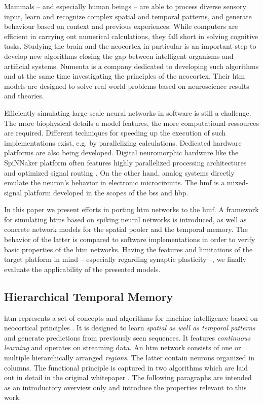 Mammals -- and especially human beings -- are able to process diverse sensory input, learn and recognize complex spatial and temporal patterns, and generate behaviour based on context and previous experiences. While computers are efficient in carrying out numerical calculations, they fall short in solving cognitive tasks. Studying the brain and the neocortex in particular is an important step to develop new algorithms closing the gap between intelligent organisms and artificial systems. Numenta is a company dedicated to developing such algorithms and at the same time investigating the principles of the neocortex. Their \gls{htm} models are designed to solve real world problems based on neuroscience results and theories.

Efficiently simulating large-scale neural networks in software is still a challenge. The more biophysical details a model features, the more computational ressources are required. Different techniques for speeding up the execution of such implementations exist, e.g. by parallelizing calculations. Dedicated hardware platforms are also being developed. Digital neuromorphic hardware like the SpiNNaker platform often features highly parallelized processing architectures and optimized signal routing \citep{furber2014spinnaker}. On the other hand, analog systems directly emulate the neuron's behavior in electronic microcircuits. The \gls{hmf} is a mixed-signal platform developed in the scopes of the \gls{bss} and \gls{hbp}.

In this paper we present efforts in porting \gls{htm} networks to the \gls{hmf}. A framework for simulating \glspl{htm} based on spiking neural networks is introduced, as well as concrete network models for the spatial pooler and the temporal memory. The behavior of the latter is compared to software implementations in order to verify basic properties of the \gls{htm} networks. Having the features and limitations of the target platform in mind -- especially regarding synaptic plasticity --, we finally evaluate the applicability of the presented models.

\subsection{Hierarchical Temporal Memory}

\gls{htm} represents a set of concepts and algorithms for machine intelligence based on neocortical principles \citep{numenta2011htm}. It is designed to learn \emph{spatial as well as temporal patterns} and generate predictions from previously seen sequences. It features \emph{continuous learning} and operates on streaming data. An \gls{htm} network consists of one or multiple hierarchically arranged \emph{regions}. The latter contain neurons organized in columns. The functional principle is captured in two algorithms which are laid out in detail in the original whitepaper \citep{numenta2011htm}. The following paragraphs are intended as an introductory overview only and introduce the properties relevant to this work.

